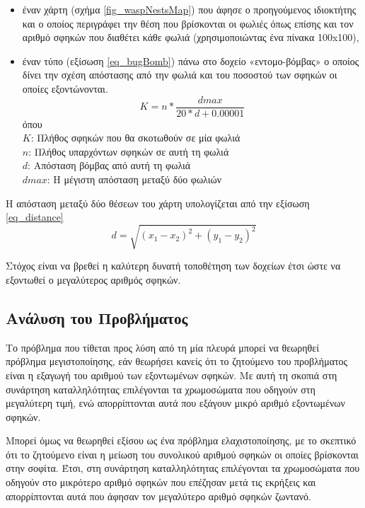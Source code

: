 \begin{itemize}
  \item  έναν χάρτη (σχήμα \ref{fig_waspNestsMap}) που άφησε ο προηγούμενος ιδιοκτήτης και ο οποίος περιγράφει την θέση που βρίσκονται οι φωλιές όπως επίσης και τον αριθμό σφηκών που διαθέτει κάθε φωλιά (χρησιμοποιώντας ένα πίνακα 100x100),
  \item έναν τύπο (εξίσωση \ref{eq_bugBomb}) πάνω στο δοχείο «εντομο-βόμβας» ο οποίος δίνει την σχέση απόστασης από την φωλιά και του ποσοστού των σφηκών οι οποίες εξοντώνονται.
      \begin{equation}\label{eq_bugBomb}
        K = n* \frac{dmax}{20*d+0.00001}
      \end{equation}
      όπου\\
      $K$: Πλήθος σφηκών που θα σκοτωθούν σε μία φωλιά\\
      $n$: Πλήθος υπαρχόντων σφηκών σε αυτή τη φωλιά\\
      $d$: Απόσταση βόμβας από αυτή τη φωλιά\\
     $dmax$: Η μέγιστη απόσταση μεταξύ δύο φωλιών\\
\end{itemize}

Η απόσταση μεταξύ δύο θέσεων του χάρτη υπολογίζεται από την εξίσωση \ref{eq_distance}
\begin{equation}\label{eq_distance}
    d = \sqrt{(x_{1}-x_{2})^2+(y_{1}-y_{2})^2}
\end{equation}

Στόχος είναι να βρεθεί η καλύτερη δυνατή τοποθέτηση των δοχείων έτσι ώστε να εξοντωθεί ο μεγαλύτερος αριθμός σφηκών.

\subsection{Ανάλυση του Προβλήματος}

Το πρόβλημα που τίθεται προς λύση από τη μία πλευρά μπορεί να θεωρηθεί πρόβλημα μεγιστοποίησης, εάν θεωρήσει κανείς ότι το ζητούμενο του προβλήματος είναι η εξαγωγή του αριθμού των εξοντωμένων σφηκών. Με αυτή τη σκοπιά στη συνάρτηση καταλληλότητας επιλέγονται τα χρωμοσώματα που οδηγούν στη μεγαλύτερη τιμή, ενώ απορρίπτονται αυτά που εξάγουν μικρό αριθμό εξοντωμένων σφηκών.

Μπορεί όμως να θεωρηθεί εξίσου ως ένα πρόβλημα ελαχιστοποίησης, με το σκεπτικό ότι το ζητούμενο είναι η μείωση του συνολικού αριθμού σφηκών οι οποίες βρίσκονται στην σοφίτα. Έτσι, στη συνάρτηση καταλληλότητας επιλέγονται τα χρωμοσώματα που οδηγούν στο μικρότερο αριθμό σφηκών που επέζησαν μετά τις εκρήξεις και απορρίπτονται αυτά που άφησαν τον μεγαλύτερο αριθμό σφηκών ζωντανό.

